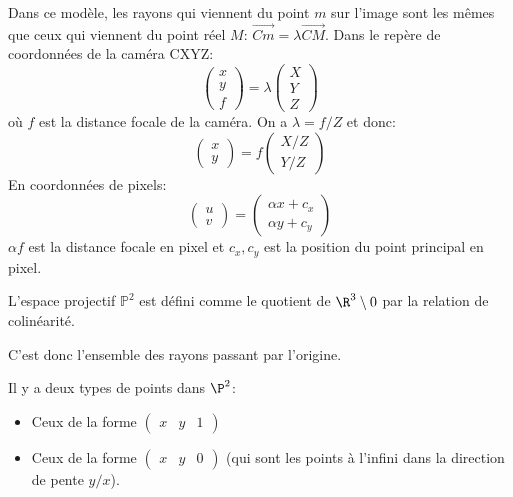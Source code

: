 \documentclass[info, math]{mpb-cours}
\begin{document}
Dans ce modèle, les rayons qui viennent du point $m$ sur l'image sont les mêmes que ceux qui viennent du point réel $M$: $\vec{Cm} = \lambda\vec{CM}$.
Dans le repère de coordonnées de la caméra CXYZ:
\begin{equation*}
	\begin{pmatrix} x\\ y \\f\end{pmatrix} = \lambda \begin{pmatrix} X \\ Y \\ Z \end{pmatrix}
\end{equation*}
où $f$ est la distance focale de la caméra.
On a $\lambda = f / Z$ et donc:
\begin{equation*}
	\begin{pmatrix} x \\ y\end{pmatrix} = f\begin{pmatrix} X / Z \\ Y / Z\end{pmatrix}
\end{equation*}
En coordonnées de pixels:
\begin{equation*}
	\begin{pmatrix}u \\ v\end{pmatrix} = \begin{pmatrix} \alpha x + c_{x}  \\ \alpha y + c_{y}\end{pmatrix}
\end{equation*}
$\alpha f$ est la distance focale en pixel et $c_{x}, c_{y}$ est la position du point principal en pixel.

\begin{definition}
	L'espace projectif $\mathbb{P}^{2}$ est défini comme le quotient de $\R^{3} \setminus 0$ par la relation de colinéarité.
\end{definition}
C'est donc l'ensemble des rayons passant par l'origine.

Il y a deux types de points dans $\P^{2}$:
\begin{itemize}
	\item Ceux de la forme $\begin{pmatrix} x & y & 1\end{pmatrix}$
	\item Ceux de la forme $\begin{pmatrix} x & y & 0\end{pmatrix}$ (qui sont les points à l'infini dans la direction de pente $y / x$).
\end{itemize}
\end{document}
